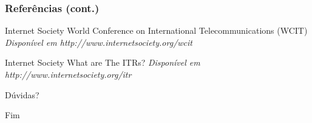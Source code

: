 \documentclass{beamer}
\begin{document}

\begin{frame}
\frametitle{Referências (cont.)}
\footnotesize{
\begin{thebibliography}{99} %

 Internet Society
\newblock World Conference on International Telecommunications (WCIT)
\newblock \emph{Disponível em http://www.internetsociety.org/wcit}

 Internet Society
\newblock What are The ITRs?
\newblock \emph{Disponível em http://www.internetsociety.org/itr}

\end{thebibliography}
}
\end{frame}


\begin{frame}
\Huge{\centerline{Dúvidas?}}
\end{frame}


\begin{frame}
\Huge{\centerline{Fim}}
\end{frame}

\end{document}
